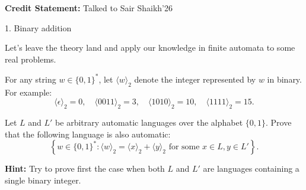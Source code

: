 \documentclass[12pt]{article}
\begin{document}


\textbf{Credit Statement:} Talked to Sair Shaikh'26

\begin{problem}{1. Binary addition}
        
    Let's leave the theory land and apply our knowledge in finite automata to some real problems.

    For any string $w \in \{0,1\}^*$, let $\langle w \rangle_2$ denote the integer represented by $w$ in binary. For example:
    \[
    \langle \epsilon \rangle_2 = 0, \quad
    \langle 0011 \rangle_2 = 3, \quad
    \langle 1010 \rangle_2 = 10, \quad
    \langle 1111 \rangle_2 = 15.
    \]

    Let $L$ and $L'$ be arbitrary automatic languages over the alphabet $\{0,1\}$. Prove that the following language is also automatic:
    \[
    \left\{ w \in \{0,1\}^* : \langle w \rangle_2 = \langle x \rangle_2 + \langle y \rangle_2 \text{ for some } x \in L, y \in L' \right\}.
    \]

    \textbf{Hint:} Try to prove first the case when both $L$ and $L'$ are languages containing a single binary integer.
\end{problem}
\end{document}
